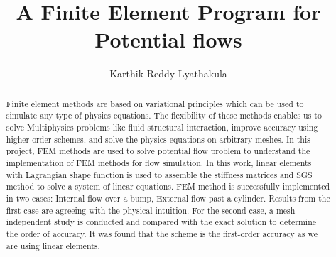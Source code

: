 \documentclass[12pt]{elsarticle}
\begin{document}
	
	\begin{frontmatter}
		
		
		
		\title{A Finite  Element Program for Potential flows}
		
		
		
		
		\author{Karthik Reddy Lyathakula}
		
		\address{North Carolina State University, Raleigh,  United States}
		
		\begin{abstract}
			Finite element methods are based on variational principles which can be used to simulate any type of physics equations. The flexibility of these methods enables us to solve Multiphysics problems like fluid structural interaction, improve accuracy using higher-order schemes, and solve the physics equations on arbitrary meshes. In this project, FEM methods are used to solve potential flow problem to understand the implementation of FEM methods for flow simulation. In this work, linear elements with Lagrangian shape function is used to assemble the stiffness matrices and SGS method to solve a system of linear equations. FEM method is successfully implemented in two cases: Internal flow over a bump, External flow past a cylinder. Results from the first case are agreeing with the physical intuition. For the second case, a mesh independent study is conducted and compared with the exact solution to determine the order of accuracy. It was found that the scheme is the first-order accuracy as we are using linear elements.
		\end{abstract}
		
		
	\end{frontmatter}
	
\end{document}
